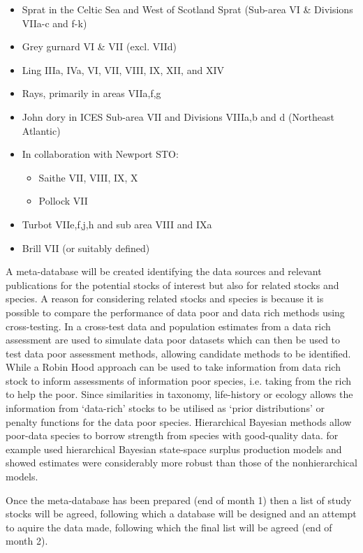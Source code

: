 \documentclass[a4paper, 10pt]{article}
\begin{document}
\begin{itemize}
 \item Sprat in the Celtic Sea and West of Scotland Sprat (Sub-area VI \& Divisions VIIa-c and f-k)
 \item Grey gurnard VI \& VII (excl. VIId)
 \item Ling IIIa, IVa, VI, VII, VIII, IX, XII, and XIV 
 \item Rays, primarily in areas VIIa,f,g 
 \item John dory in ICES Sub-area VII and Divisions VIIIa,b and d (Northeast Atlantic)
 \item In collaboration with Newport STO:
\begin{itemize} 
 \item Saithe VII, VIII, IX, X
 \item Pollock VII
\end{itemize}
\item Turbot VIIe,f,j,h and sub area VIII and IXa
\item Brill VII (or suitably defined)
\end{itemize}
A meta-database will be created identifying the data sources and relevant publications for the potential stocks of interest but also for related stocks and species. A reason for considering related stocks and species is because it is possible to compare the performance of data poor and data rich methods using cross-testing. In a cross-test data and population estimates from a data rich assessment are used to simulate data poor datasets which can then be used to test data poor assessment methods, allowing candidate methods to be identified. While a Robin Hood approach can be used to take information from data rich stock to inform assessments of information poor species, i.e. taking from the rich to help the poor. Since similarities in taxonomy, life-history or ecology allows the information from ‘data-rich’ stocks to be utilised as ‘prior distributions’ or penalty functions for the data poor species. Hierarchical Bayesian methods allow poor-data species to borrow strength from species with good-quality data. \cite{jiao2011poor} for example used hierarchical Bayesian state-space surplus production models and showed estimates were considerably more robust than those of the nonhierarchical models.

Once the meta-database has been prepared (end of month 1) then a list of study stocks will be agreed, following which a database will be designed and an attempt to aquire the data made, following which the final list will be agreed (end of month 2). 
\end{document}
